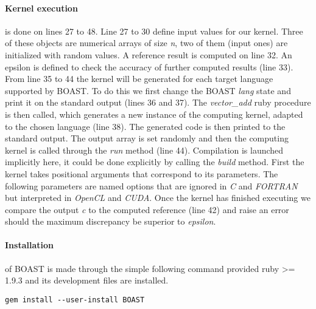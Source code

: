 \paragraph{Kernel execution} is done on lines 27 to 48.
Line 27 to 30 define input values for our kernel.
Three of these objects are numerical arrays of size \emph{n}, two of them (input ones) are initialized with random values.
A reference result is computed on line 32.
An epsilon is defined to check the accuracy of further computed results (line 33).
From line 35 to 44 the kernel will be generated for each target language supported by BOAST.
To do this we first change the BOAST \emph{lang} state and print it on the standard output (lines 36 and 37).
The \emph{vector\_add} ruby procedure is then called, which generates a new instance of the computing kernel, adapted to the chosen language (line 38).
The generated code is then printed to the standard output.
The output array is set randomly and then the computing kernel is called through the \emph{run} method  (line 44).
Compilation is launched implicitly here, it could be done explicitly by calling the \emph{build} method.
First the kernel takes positional arguments that correspond to its parameters.
The following parameters are named options that are ignored in \emph{C} and \emph{FORTRAN} but interpreted in \emph{OpenCL} and \emph{CUDA}.
Once the kernel has finished executing we compare the output \emph{c} to the computed reference (line 42) and raise an error should the maximum discrepancy be superior to \emph{epsilon}.

\paragraph{Installation} of BOAST is made through the simple following command provided ruby >= 1.9.3 and its development files are installed.

\lstset{style=Bash}
\begin{lstlisting}
gem install --user-install BOAST
\end{lstlisting}

